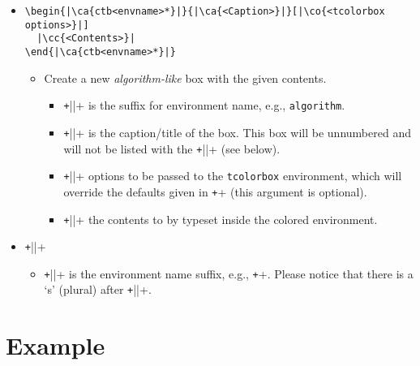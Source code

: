 \documentclass{article}
\begin{document}
\begin{itemize}
 \item \begin{verbatim}
\begin{|\ca{ctb<envname>*}|}{|\ca{<Caption>}|}[|\co{<tcolorbox options>}|]
  |\cc{<Contents>}|
\end{|\ca{ctb<envname>*}|}
\end{verbatim}
  \begin{itemize}
    \item Create a new \emph{algorithm-like} box with the given contents.
    \begin{itemize}
      \item \texttt+||+ is the suffix for environment name,
            e.g., \verb+algorithm+.
      \item \texttt+||+ is the caption/title of
            the box.  This box will be unnumbered and will not be listed with the
            \texttt+\cthlistof||+
            (see below).
      \item \texttt+||+ options to be
            passed to the \verb+tcolorbox+ environment, which will override the defaults
            given in \texttt+\cthnewalgorithm+  (this argument is optional).
      \item \texttt+||+ the contents to by typeset inside the colored environment.
    \end{itemize}
  \end{itemize}

  \item \texttt+\cthlistof||+
  \begin{itemize}
      \item \texttt+||+ is the environment name
            suffix, e.g., \texttt+\cthlistofalgorithms+.
            Please notice that there is a `s' (plural) after
            \texttt+||+.
  \end{itemize}
\end{itemize}

\clearpage
\section{Example}
\label{sec:examples}
\end{document}
